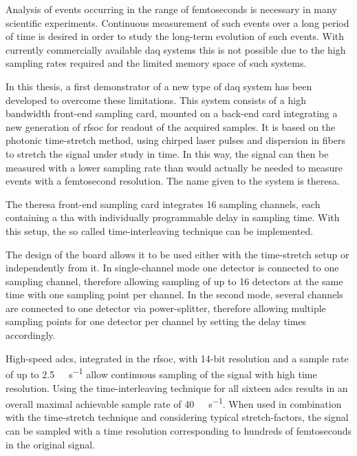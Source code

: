 
Analysis of events occurring in the range of femtoseconds is necessary in many scientific experiments.
Continuous measurement of such events over a long period of time is desired in order to study the long-term evolution of such events.
With currently commercially available \gls{daq} systems this is not possible due to the high sampling rates required and the limited memory space of such systems. 

In this thesis, a first demonstrator of a new type of \gls{daq} system has been developed to overcome these limitations.
This system consists of a high bandwidth front-end sampling card, mounted on a back-end card integrating a new generation of \gls{rfsoc} for readout of the acquired samples. 
It is based on the photonic time-stretch method, using chirped laser pulses and dispersion in fibers to stretch the signal under study in time.
In this way, the signal can then be measured with a lower sampling rate than would actually be needed to measure events with a femtosecond resolution.
The name given to the system is \gls{theresa}.

The \gls{theresa} front-end sampling card integrates 16 sampling channels, each containing a \gls{tha} with individually programmable delay in sampling time. 
With this setup, the so called time-interleaving technique can be implemented. 

The design of the board allows it to be used either with the time-stretch setup or independently from it.
In single-channel mode one detector is connected to one sampling channel, therefore allowing sampling of up to 16 detectors at the same time with one sampling point per channel.
In the second mode, several channels are connected to one detector via power-splitter, therefore allowing multiple sampling points for one detector per channel by setting the delay times accordingly. 

High-speed \glspl{adc}, integrated in the \gls{rfsoc}, with 14-bit resolution and a sample rate of up to \SI{2.5}{\giga \sample\per\second} allow continuous sampling of the signal with high time resolution. 
Using the time-interleaving technique for all sixteen \glspl{adc} results in an overall maximal achievable sample rate of \SI{40}{\giga\sample\per\second}. 
When used in combination with the time-stretch technique and considering typical stretch-factors, the signal can be sampled with a time resolution corresponding to hundreds of femtoseconds in the original signal.

